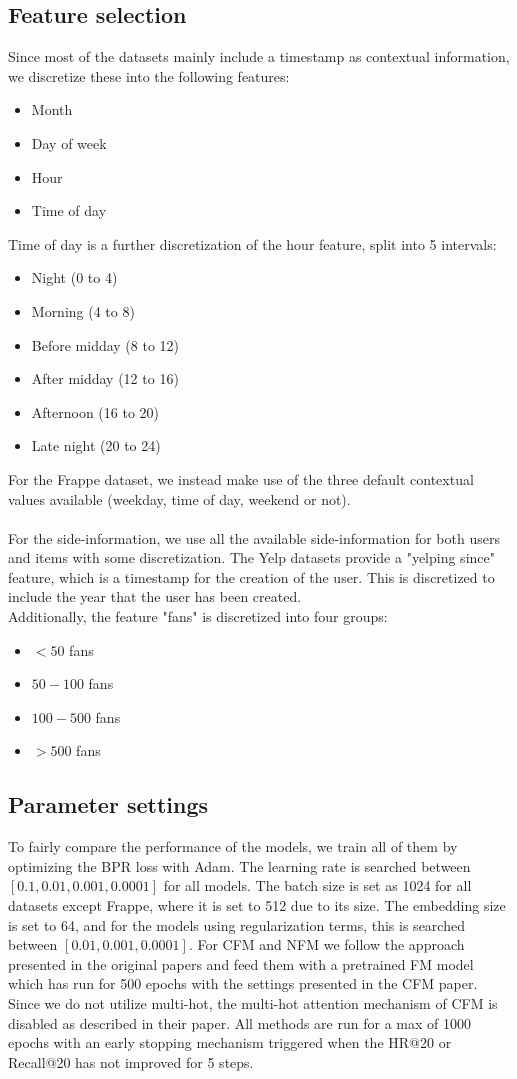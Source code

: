 \subsection{Feature selection}
Since most of the datasets mainly include a timestamp as contextual information, we discretize these into the following features:
\begin{itemize}
	\item Month
	\item Day of week
	\item Hour
	\item Time of day
\end{itemize}
Time of day is a further discretization of the hour feature, split into 5 intervals:
\begin{itemize}
	\item Night (0 to 4)
	\item Morning (4 to 8)
	\item Before midday (8 to 12)
	\item After midday (12 to 16)
	\item Afternoon (16 to 20)
	\item Late night (20 to 24)
\end{itemize}
For the Frappe dataset, we instead make use of the three default contextual values available (weekday, time of day, weekend or not).
\\\\
For the side-information, we use all the available side-information for both users and items with some discretization.
The Yelp datasets provide a "yelping since" feature, which is a timestamp for the creation of the user.
This is discretized to include the year that the user has been created.
\\
Additionally, the feature "fans" is discretized into four groups:
\begin{itemize}
	\item $< 50$ fans
	\item $50 - 100$ fans
	\item $100-500$ fans
	\item $> 500$ fans
\end{itemize}


\subsection{Parameter settings}
To fairly compare the performance of the models, we train all of them by optimizing the BPR loss with Adam.
The learning rate is searched between $[0.1, 0.01, 0.001, 0.0001]$ for all models.
The batch size is set as 1024 for all datasets except Frappe, where it is set to 512 due to its size.
The embedding size is set to 64, and for the models using regularization terms, this is searched between $[0.01, 0.001, 0.0001]$.
For CFM and NFM we follow the approach presented in the original papers and feed them with a pretrained FM model which has run for 500 epochs with the settings presented in the CFM paper.
Since we do not utilize multi-hot, the multi-hot attention mechanism of CFM is disabled as described in their paper.
All methods are run for a max of 1000 epochs with an early stopping mechanism triggered when the HR@20 or Recall@20 has not improved for 5 steps.


